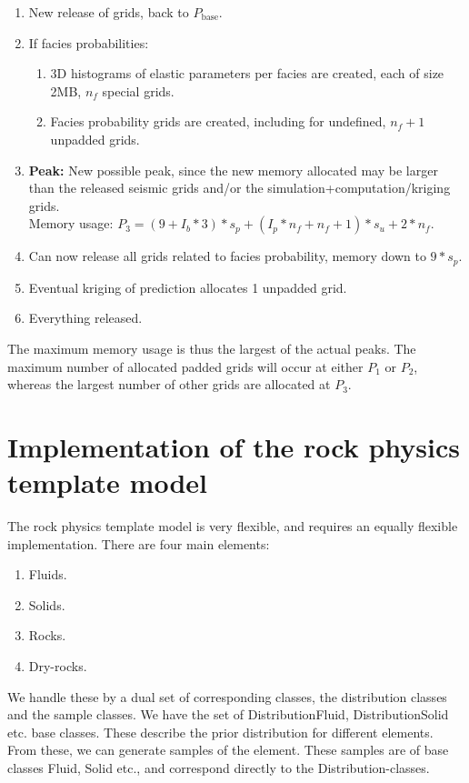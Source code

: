 \begin{enumerate}
\item New release of grids, back to $P_\text{base}$.
\item If facies probabilities:
\begin{enumerate}
\item 3D histograms of elastic parameters per facies are created, each
  of size 2MB, $n_f$ special grids.
\item Facies probability grids are created, including for undefined,
  $n_f+1$ unpadded grids.
\end{enumerate}
\item {\bf Peak:} New possible peak, since the new memory allocated
  may be larger than the released seismic grids and/or the
  simulation+computation/kriging grids. \\
    Memory usage: $P_3 = (9+I_b*3)*s_p+(I_p*n_f + n_f +1)*s_u + 2*n_f$.
\item Can now release all grids related to facies probability, memory down to $9*s_p$.
\item Eventual kriging of prediction allocates 1 unpadded grid.
\item Everything released.
\end{enumerate}

The maximum memory usage is thus the largest of the actual peaks. The
maximum number of allocated padded grids will occur at either $P_1$ or
$P_2$, whereas the largest number of other grids are allocated at
$P_3$.

\section{Implementation of the rock physics template model}
\label{sec:rf}
The rock physics template model is very flexible, and requires an equally flexible implementation. There are four main elements:
\begin{enumerate}
\item Fluids.
\item Solids.
\item Rocks.
\item Dry-rocks.
\end{enumerate}
We handle these by a dual set of corresponding classes, the distribution classes and the sample classes. We have the set of DistributionFluid, DistributionSolid etc. base classes. These describe the prior distribution for different elements. From these, we can generate samples of the element. These samples are of base classes Fluid, Solid etc., and correspond directly to the Distribution-classes.

